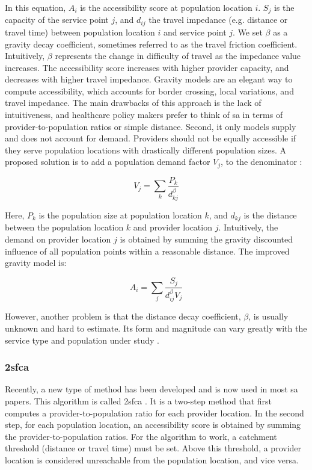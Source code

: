 In this equation, $A_i$ is the accessibility score at population location $i$.
$S_j$ is the capacity of the service point $j$, and $d_{ij}$ the travel
impedance (e.g. distance or travel time) between population location $i$ and
service point $j$. We set $\beta$ as a gravity decay coefficient, sometimes
referred to as the travel friction coefficient. Intuitively, $\beta$ represents
the change in difficulty of travel as the impedance value increases. The
accessibility score increases with higher provider capacity, and decreases with
higher travel impedance. Gravity models are an elegant way to compute
accessibility, which accounts for border crossing, local variations, and travel
impedance. The main drawbacks of this approach is the lack of intuitiveness, and
healthcare policy makers prefer to think of \ac{sa} in terms of
provider-to-population ratios or simple distance. Second, it only models supply
and does not account for demand. Providers should not be equally accessible if
they serve population locations with drastically different population sizes. A
proposed solution is to add a population demand factor $V_j$, to the denominator
\cite{joseph_measuring_1982}:

\begin{equation}
    V_j = \sum_k \frac{P_k}{d_{kj}^{\beta}}
\end{equation}

Here, $P_k$ is the population size at population location $k$, and $d_{kj}$ is
the distance between the population location $k$ and provider location $j$.
Intuitively, the demand on provider location $j$ is obtained by summing the
gravity discounted influence of all population points within a reasonable
distance. The improved gravity model is:

\begin{equation}
    A_i = \sum_j \frac{S_j}{d_{ij}^{\beta} V_j}
\end{equation}

However, another problem is that the distance decay coefficient, $\beta$, is
usually unknown and hard to estimate. Its form and magnitude can vary greatly
with the service type and population under study \cite{talen_assessing_1998}.

\subsubsection{\acf{2sfca}}

Recently, a new type of method has been developed and is now used in most
\ac{sa} papers. This algorithm is called \acf{2sfca} \cite{luo_using_2004}. It is
a two-step method that first computes a provider-to-population ratio for each
provider location. In the second step, for each population location, an
accessibility score is obtained by summing the provider-to-population ratios.
For the algorithm to work, a catchment threshold (distance or travel time) must
be set. Above this threshold, a provider location is considered unreachable from
the population location, and vice versa.

